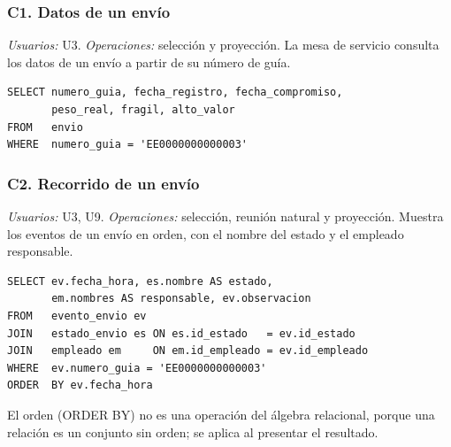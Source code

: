 \subsubsection{C1. Datos de un envío}
\label{q:C1}
\textit{Usuarios:} U3. \textit{Operaciones:} selección y proyección. La mesa de servicio consulta los datos de un envío a partir de su número de guía.

\begin{center}\end{center}

\begin{lstlisting}[style=sqlpro]
SELECT numero_guia, fecha_registro, fecha_compromiso,
       peso_real, fragil, alto_valor
FROM   envio
WHERE  numero_guia = 'EE0000000000003'
\end{lstlisting}


\subsubsection{C2. Recorrido de un envío}
\label{q:C2}
\textit{Usuarios:} U3, U9. \textit{Operaciones:} selección, reunión natural y proyección. Muestra los eventos de un envío en orden, con el nombre del estado y el empleado responsable.

\begin{center}\end{center}

\begin{lstlisting}[style=sqlpro]
SELECT ev.fecha_hora, es.nombre AS estado,
       em.nombres AS responsable, ev.observacion
FROM   evento_envio ev
JOIN   estado_envio es ON es.id_estado   = ev.id_estado
JOIN   empleado em     ON em.id_empleado = ev.id_empleado
WHERE  ev.numero_guia = 'EE0000000000003'
ORDER  BY ev.fecha_hora
\end{lstlisting}
El orden (ORDER BY) no es una operación del álgebra relacional, porque una relación es un conjunto sin orden; se aplica al presentar el resultado.


